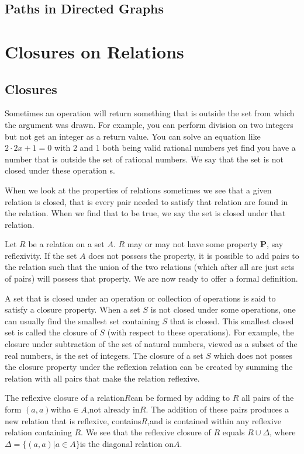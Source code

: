   \subsection{Paths in Directed Graphs}

\section{Closures on Relations}
  \subsection{Closures}
Sometimes an operation will return something that is outside the set from which the argument was drawn. For example, you can perform division on two integers but not get an integer as a return value. You can solve an equation like $2\cdot 2x+1=0$ with 2 and 1 both being valid rational numbers yet find you have a number that is outside the set of rational numbers. We say that the set is not closed under these operation                                  s. 

When we look at the properties of relations sometimes we see that a given relation is closed, that is every pair needed to satisfy that relation are found in the relation. When we find that to be true, we say the set is closed under that relation.

Let $R$ be a relation on a set $A$. $R$ may or may not have some property \textbf{P}, say reflexivity. If the set $A$ does not possess the property, it is possible to add pairs to the relation such that the union of the two relations (which after all are just sets of pairs) will possess that property. We are now ready to offer a formal definition.

\begin{definition}[Closure]
A set that is closed under an operation or collection of operations is said to satisfy a closure property. When a set $S$ is not closed under some operations, one can usually find the smallest set containing $S$ that is closed. This smallest closed set is called the closure of $S$ (with respect to these operations). For example, the closure under subtraction of the set of natural numbers, viewed as a subset of the real numbers, is the set of integers. The closure of a set $S$ which does not posses the closure property under the reflexion relation can be created by summing the relation with all pairs that make the relation reflexive.
\end{definition}
The reflexive closure of a relation$R$can be formed by adding to $R$ all pairs of the form $(a,a)$with$a\in A$,not already in$R$. The addition of these pairs produces a new relation that is reflexive, contains$R$,and is contained within any reflexive relation containing $R$. We see that the reflexive closure of $R$ equals $R \cup \Delta$, where $\Delta=\{(a,a)\vert a\in A\}$is the diagonal relation on$A$.
 
